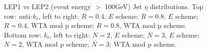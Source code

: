 \begin{figure}[H]
\hfill
{}\hfill
\caption{LEP1 vs LEP2 (event energy $>$ 100GeV) Jet $\eta$ distributions. Top row: anti-$k_t$, left to right: $R=0.4$, $E$ scheme; $R=0.8$, $E$ scheme; $R=0.4$, WTA mod p scheme; $R=0.8$, WTA mod p scheme. Bottom row: $k_t$, left to right: $N=2$, $E$ scheme; $N=3$, $E$ scheme; $N=2$, WTA mod p scheme; $N=3$; WTA mod p scheme.}  
\end{figure}

